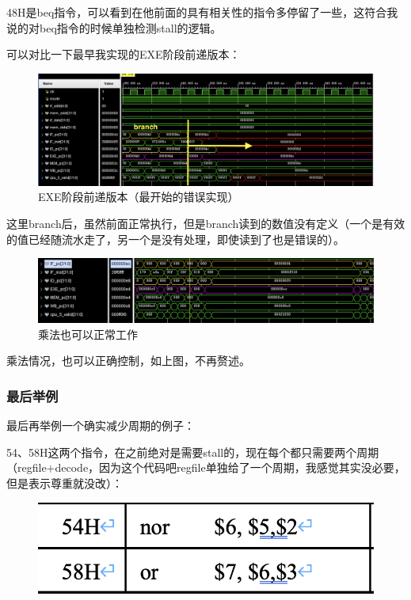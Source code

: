 \documentclass[a4paper]{article}
\begin{document}
48H是beq指令，可以看到在他前面的具有相关性的指令多停留了一些，这符合我说的对beq指令的时候单独检测stall的逻辑。

可以对比一下最早我实现的EXE阶段前递版本：

\begin{figure}[H]
    \centering
    \includegraphics[width=\linewidth]{img/先前错误/增加完EXE阶段旁路2.png}
    \caption{EXE阶段前递版本（最开始的错误实现）}
\end{figure}

这里branch后，虽然前面正常执行，但是branch读到的数值没有定义（一个是有效的值已经随流水走了，另一个是没有处理，即使读到了也是错误的）。



\begin{figure}[H]
    \centering
    \includegraphics[width=\linewidth]{img/旁路修改图片/乘法情况ech也正常工作.png}
    \caption{乘法也可以正常工作}
\end{figure}
乘法情况，也可以正确控制，如上图，不再赘述。

\subsubsection{最后举例}

最后再举例一个确实减少周期的例子：

54、58H这两个指令，在之前绝对是需要stall的，现在每个都只需要两个周期（regfile+decode，因为这个代码吧regfile单独给了一个周期，我感觉其实没必要，但是表示尊重就没改）：


\begin{figure}[H]
    \centering
    \includegraphics[width=0.5\linewidth]{img/顺序图片/5458H.png}
\end{figure}
\end{document}

